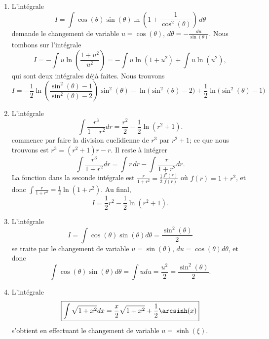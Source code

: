 \begin{enumerate}
	\item
	      L'intégrale
	      \begin{equation}
		      I=\int \cos(\theta)\sin(\theta)\ln\left( 1+\frac{1}{ \cos^2(\theta) } \right)\,d\theta
	      \end{equation}
	      demande le changement de variable \( u=\cos(\theta)\), \( d\theta=-\frac{ du }{ \sin(\theta) }\). Nous tombons sur l'intégrale
	      \begin{equation}
		      I=-\int u\ln\left( \frac{ 1+u^2 }{ u^2 } \right)=-\int u\ln(1+u^2)+\int u\ln(u^2),
	      \end{equation}
	      qui sont deux intégrales déjà faites. Nous trouvons
	      \begin{equation}
		      I=-\frac{ 1 }{2}\ln\left( \frac{ \sin^2(\theta)-1 }{ \sin^2(\theta)-2 } \right)\sin^2(\theta)-\ln\big( \sin^2(\theta)-2 \big)+\frac{ 1 }{2}\ln\big( \sin^2(\theta)-1 \big)
	      \end{equation}

	\item
	      L'intégrale
	      \begin{equation}
		      \boxed{\int \frac{ r^3 }{ 1+r^2 }dr=\frac{ r^2 }{2}-\frac{ 1 }{2}\ln(r^2+1).}
	      \end{equation}
	      commence par faire la division euclidienne de \( r^3\) par \( r^2+1\); ce que nous trouvons est \( r^3=(r^2+1)r-r\). Il reste à intégrer
	      \begin{equation}
		      \int \frac{ r^3 }{ 1+r^2 }dr=\int r\,dr-\int\frac{ r }{ 1+r^2 }dr.
	      \end{equation}
	      La fonction dans la seconde intégrale est \( \frac{ r }{ 1+r^2 }=\frac{ 1 }{2}\frac{ f'(r) }{ f(r) }\) où \( f(r)=1+r^2\), et donc \( \int \frac{ r }{ 1+r^2 }=\frac{ 1 }{2}\ln(1+r^2)\). Au final,
	      \begin{equation}
		      I=\frac{ 1 }{2}r^2-\frac{ 1 }{2}\ln(r^2+1).
	      \end{equation}


	\item
	      L'intégrale
	      \begin{equation}	\label{EqTrucIntsxcxdx}
		      \boxed{I=\int \cos(\theta)\sin(\theta)d\theta=\frac{ \sin^2(\theta) }{ 2 }}
	      \end{equation}
	      se traite par le changement de variable \( u=\sin(\theta)\), \( du=\cos(\theta)d\theta\), et donc
	      \begin{equation}
		      \int\cos(\theta)\sin(\theta)d\theta=\int udu=\frac{ u^2 }{2}=\frac{ \sin^2(\theta) }{ 2 }.
	      \end{equation}
	\item
	      L'intégrale
	      \begin{equation}	\label{EqTrucsIntsqrtAplusu}
		      \boxed{\int\sqrt{1+x^2}dx=\frac{ x }{2}\sqrt{1+x^2}+\frac{ 1 }{2}\arcsinh(x)}
	      \end{equation}
	      s'obtient en effectuant le changement de variable \( u=\sinh(\xi)\).


\end{enumerate}
